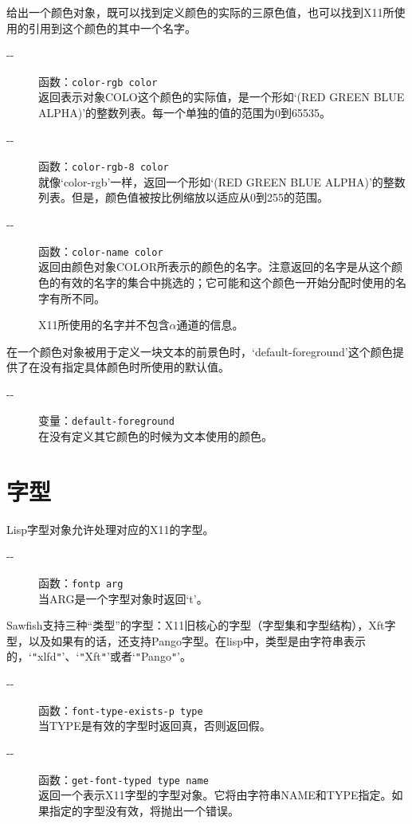 \documentclass{book}
\begin{document}
\begin{CJK*}{UTF8}{gbsn}
给出一个颜色对象，既可以找到定义颜色的实际的三原色值，也可以找到X11所使用的引用到这个颜色的其中一个名字。
\begin{description}
\item[-{}-] 函数：\verb|color-rgb color|\\
返回表示对象COLO这个颜色的实际值，是一个形如`(RED GREEN BLUE ALPHA)'的整数列表。每一个单独的值的范围为0到65535。
\item[-{}-] 函数：\verb|color-rgb-8 color|\\
就像`color-rgb'一样，返回一个形如`(RED GREEN BLUE ALPHA)'的整数列表。但是，颜色值被按比例缩放以适应从0到255的范围。
\item[-{}-] 函数：\verb|color-name color|\\
返回由颜色对象COLOR所表示的颜色的名字。注意返回的名字是从这个颜色的有效的名字的集合中挑选的；它可能和这个颜色一开始分配时使用的名字有所不同。

X11所使用的名字并不包含$\alpha $通道的信息。
\end{description}

在一个颜色对象被用于定义一块文本的前景色时，`default-foreground'这个颜色提供了在没有指定具体颜色时所使用的默认值。
\begin{description}
\item[-{}-] 变量：\verb|default-foreground|\\
在没有定义其它颜色的时候为文本使用的颜色。
\end{description}
\chapter{字型}
Lisp字型对象允许处理对应的X11的字型。
\begin{description}
\item[-{}-] 函数：\verb|fontp arg|\\
当ARG是一个字型对象时返回`t'。
\end{description}

Sawfish支持三种``类型''的字型：X11旧核心的字型（字型集和字型结构），Xft字型，以及如果有的话，还支持Pango字型。在lisp中，类型是由字符串表示的，`\verb|"|xlfd\verb|"|'、`\verb|"|Xft\verb|"|'或者`\verb|"|Pango\verb|"|'。
\begin{description}
\item[-{}-] 函数：\verb|font-type-exists-p type|\\
当TYPE是有效的字型时返回真，否则返回假。
\item[-{}-] 函数：\verb|get-font-typed type name|\\
返回一个表示X11字型的字型对象。它将由字符串NAME和TYPE指定。如果指定的字型没有效，将抛出一个错误。


\end{description}
\end{CJK*}
\end{document}
